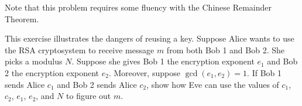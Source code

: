 \documentclass{article}
\begin{document}
    Note that this problem requires some fluency with the Chinese Remainder Theorem.
    \fi

    \begin{exercise}
        This exercise illustrates the dangers of reusing a key.
        Suppose Alice wants to use the RSA cryptosystem to receive message \(m\) from both Bob 1 and Bob 2.
        She picks a modulus \(N\).
        Suppose she gives Bob 1 the encryption exponent \(e_1\) and Bob 2 the encryption exponent \(e_2\).
        Moreover, suppose \(\gcd(e_1,e_2)=1\).
        If Bob 1 sends Alice \(c_1\) and Bob 2 sends Alice \(c_2\), show how Eve can use the values of \(c_1\), \(c_2\), \(e_1\), \(e_2\), and \(N\) to figure out \(m\).
    \end{exercise}
    \iffalse
    Solution: 
    Use Bezout's lemma to get \(e_1 x + e_2 y = 1\) and consider \(c_1^x c_2^y\).
    \fi
\end{document}
